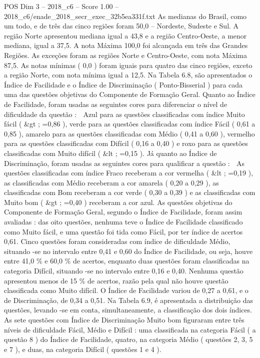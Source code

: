 \begin{textsample}{POS Dim 3 – 2018\_c6 – Score 1.00 – 2018\_c6/enade\_2018\_secr\_exec\_32b5ea331f.txt}
As medianas do Brasil, como um todo, e de três das cinco regiões foram 50,0 – Nordeste, Sudeste e Sul.
A região Norte apresentou mediana igual a 43,8 e a região Centro-Oeste, a menor mediana, igual a 37,5.
A nota Máxima 100,0 foi alcançada em três das Grandes Regiões.
As exceções foram as regiões Norte e Centro-Oeste, com nota Máxima 87,5.
As notas mínimas ( 0,0 ) foram iguais para quatro das cinco regiões, exceto a região Norte, com nota mínima igual a 12,5.
Na Tabela 6.8, são apresentados o Índice de Facilidade e o Índice de Discriminação ( Ponto-Bisserial ) para cada uma das questões objetivas do Componente de Formação Geral.
Quanto ao Índice de Facilidade, foram usadas as seguintes cores para diferenciar o nível de dificuldade da questão :  Azul para as questões classificadas com índice Muito fácil ( \&gt ; =0,86 ), verde para as questões classificadas com índice Fácil ( 0,61 a 0,85 ), amarelo para as questões classificadas com Médio ( 0,41 a 0,60 ), vermelho para as questões classificadas com Difícil ( 0,16 a 0,40 ) e roxo para as questões classificadas com Muito difícil ( \&lt ; =0,15 ).
Já quanto ao Índice de Discriminação, foram usadas as seguintes cores para qualificar a questão :  As questões classificadas com índice Fraco receberam a cor vermelha ( \&lt ; =0,19 ), as classificadas com Médio receberam a cor amarela ( 0,20 a 0,29 ), as classificadas com Bom receberam a cor verde ( 0,30 a 0,39 ) e as classificadas com Muito bom ( \&gt ; =0,40 ) receberam a cor azul.
As questões objetivas do Componente de Formação Geral, segundo o Índice de Facilidade, foram assim avaliadas : das oito questões, nenhuma teve o Índice de Facilidade classificado como Muito fácil, e uma questão foi tida como Fácil, por ter índice de acertos 0,61.
Cinco questões foram consideradas com índice de dificuldade Médio, situando -se no intervalo entre 0,41 e 0,60 do Índice de Facilidade, ou seja, houve entre 41,0 \% e 60,0 \% de acertos, enquanto duas questões foram classificadas na categoria Difícil, situando -se no intervalo entre 0,16 e 0,40.
Nenhuma questão apresentou menos de 15 \% de acertos, razão pela qual não houve questão classificada como Muito difícil.
O Índice de Facilidade variou de 0,27 a 0,61, e o de Discriminação, de 0,34 a 0,51.
Na Tabela 6.9, é apresentada a distribuição das questões, levando -se em conta, simultaneamente, a classificação dos dois índices.
As sete questões com Índice de Discriminação Muito bom figuraram entre três níveis de dificuldade Fácil, Médio e Difícil : uma classificada na categoria Fácil ( a questão 8 ) do Índice de Facilidade, quatro, na categoria Médio ( questões 2, 3, 5 e 7 ), e duas, na categoria Difícil ( questões 1 e 4 ).

\end{textsample}
